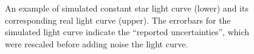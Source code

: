\begin{figure}
\caption{An example of simulated constant star light curve (lower) and its corresponding real light curve (upper). The errorbars for the simulated light curve indicate the ``reported uncertainties'', which were rescaled before adding noise the light curve.}\label{fig.const.flc.example}
\end{figure}




